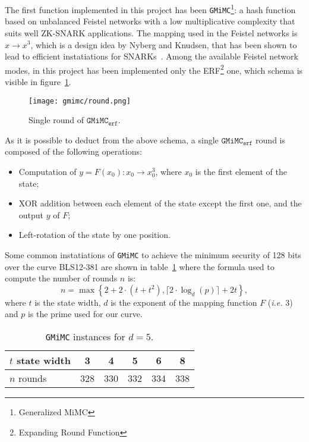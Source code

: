 \documentclass[12pt, a4paper]{report}
\begin{document}
The first function implemented in this project has been \texttt{GMiMC}\footnote{Generalized MiMC}: a hash function based on unbalanced Feistel networks with a low multiplicative complexity that suits well ZK-SNARK applications. The mapping used in the Feistel networks is $x \rightarrow x^3$, which is a design idea by Nyberg and Knudsen, that has been shown to lead to efficient instatiations for SNARKs~\cite{mimc}. Among the available Feistel network modes, in this project has been implemented only the ERF\footnote{Expanding Round Function} one, which schema is visible in figure~\ref{fig:gmimc}.

\begin{figure}[H]
  \begin{center}
    \texttt{[image: gmimc/round.png]}
  \end{center}
  \caption{Single round of $\texttt{GMiMC}_\texttt{erf}$.}\label{fig:gmimc}
\end{figure}

As it is possible to deduct from the above schema, a single $\texttt{GMiMC}_\texttt{erf}$ round is composed of the following operations:
\begin{itemize}
  \item Computation of $y = F(x_0): x_0 \rightarrow x_0^3$, where $x_0$ is the first element of the state;
  \item XOR addition between each element of the state except the first one, and the output $y$ of $F$;
  \item Left-rotation of the state by one position.
\end{itemize}

Some common instatiations of \texttt{GMiMC} to achieve the minimum security of 128 bits over the curve BLS12-381 are shown in table~\ref{tab:gmimcinstances} where the formula used to compute the number of rounds $n$ is:
\begin{equation}
  n = \max \left\{ 2 + 2 \cdot (t + t^2), \lceil 2 \cdot \log_d(p) \rceil + 2t \right\},
  \label{eq:gmimcrounds}
\end{equation}
where $t$ is the state width, $d$ is the exponent of the mapping function $F$ (\textsl{i.e.} 3) and $p$ is the prime used for our curve.

\begin{table}[H]
  \caption{\texttt{GMiMC} instances for $d = 5$.}\label{tab:gmimcinstances}
  \begin{center}
    \begin{tabular}{|l|c|c|c|c|c|}
      \hline
      $t$ state width & 3 & 4 & 5 & 6 & 8 \\
      \hline
      $n$ rounds & 328 & 330 & 332 & 334 & 338 \\
      \hline
    \end{tabular}
  \end{center}
\end{table}
\end{document}
